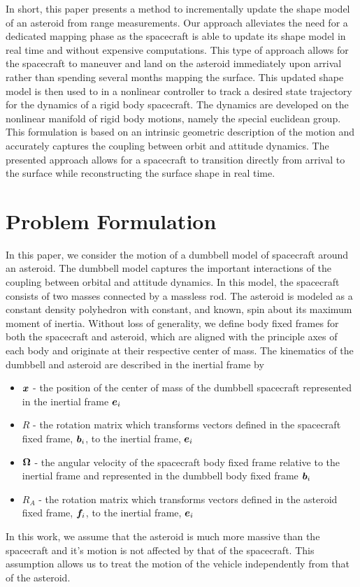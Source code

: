 \documentclass[letterpaper, paper,11pt]{AAS}		%
\begin{document}
In short, this paper presents a method to incrementally update the shape  model of an asteroid from range measurements. 
Our approach alleviates the need for a dedicated mapping phase as the spacecraft is able to update its shape model in real time and without expensive computations.
This type of approach allows for the spacecraft to maneuver and land on the asteroid immediately upon arrival rather than spending several months mapping the surface.
This updated shape model is then used to in a nonlinear controller to track a desired state trajectory for the dynamics of a rigid body spacecraft.
The dynamics are developed on the nonlinear manifold of rigid body motions, namely the special euclidean group.
This formulation is based on an intrinsic geometric description of the motion and accurately captures the coupling between orbit and attitude dynamics. 
The presented approach allows for a spacecraft to transition directly from arrival to the surface while reconstructing the surface shape in real time.


\section{Problem Formulation}\label{sec:problem}

In this paper, we consider the motion of a dumbbell model of spacecraft around an asteroid.
The dumbbell model captures the important interactions of the coupling between orbital and attitude dynamics.
In this model, the spacecraft consists of two masses connected by a massless rod.
The asteroid is modeled as a constant density polyhedron with constant, and known, spin about its maximum moment of inertia. 
Without loss of generality, we define body fixed frames for both the spacecraft and asteroid, which are aligned with the principle axes of each body and originate at their respective center of mass. 
The kinematics of the dumbbell and asteroid are described in the inertial frame by
\begin{itemize}
    \item \( \bm{x} \) - the position of the center of mass of the dumbbell spacecraft represented in the inertial frame \( \bm{e}_i\)
    \item \( R \) - the rotation matrix which transforms vectors defined in the spacecraft fixed frame, \( \bm{b}_i \), to the inertial frame, \( \bm{e}_i \)
    \item \( \bm{\Omega} \) - the angular velocity of the spacecraft body fixed frame relative to the inertial frame and represented in the dumbbell body fixed frame \( \bm{b}_i \)
    \item \( R_A \) - the rotation matrix which transforms vectors defined in the asteroid fixed frame, \( \bm{f}_i \), to the inertial frame, \( \bm{e}_i \)
\end{itemize}
In this work, we assume that the asteroid is much more massive than the spacecraft and it's motion is not affected by that of the spacecraft.
This assumption allows us to treat the motion of the vehicle independently from that of the asteroid. 
\end{document}
